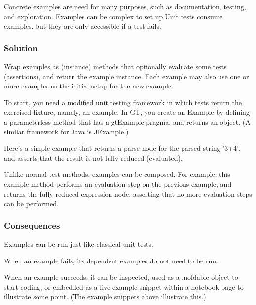 \documentclass[sigconf]{acmart}
\begin{document}
Concrete examples are need for many purposes, such as documentation, testing, and exploration.
Examples can be complex to set up.Unit tests consume examples, but they are only accessible if a test fails.

\subsubsection*{Solution}

Wrap examples as (instance) methods that optionally evaluate some tests (assertions), and return the example instance. Each example may also use one or more examples as the initial setup for the new example.

To start, you need a modified unit testing framework in which tests return the exercised fixture, namely, an example. In GT, you create an Example by defining a parameterless method that has a \st{gtExample} pragma, and returns an object. (A similar framework for Java is JExample.)

Here's a simple example that returns a parse node for the parsed string '3+4', and asserts that the result is not fully reduced (evaluated).

    
Unlike normal test methods, examples can be composed. For example, this example method performs an evaluation step on the previous example, and returns the fully reduced expression node, asserting that no more evaluation steps can be performed.

    

\subsubsection*{Consequences}

Examples can be run just like classical unit tests.

When an example fails, its dependent examples do not need to be run.

When an example succeeds, it can be inspected, used as a moldable object to start coding, or embedded as a live example snippet within a notebook page to illustrate some point. (The example snippets above illustrate this.)
\end{document}
